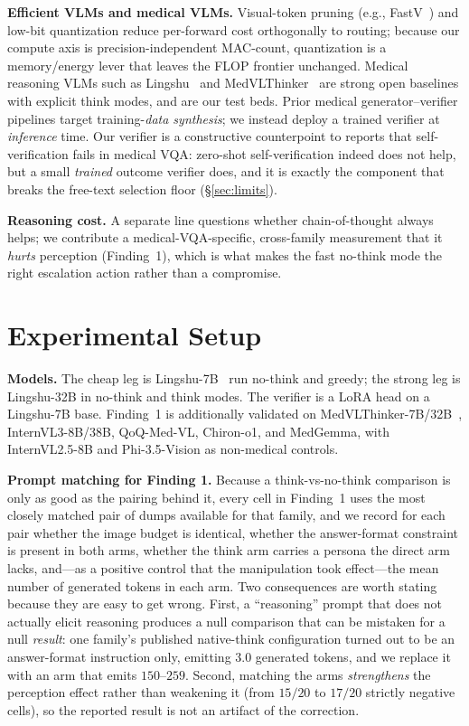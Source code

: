 \documentclass[conference]{IEEEtran}
\begin{document}
\textbf{Efficient VLMs and medical VLMs.} Visual-token pruning (e.g., FastV~\cite{fastv}) and low-bit quantization reduce per-forward cost orthogonally to routing; because our compute axis is precision-independent MAC-count, quantization is a memory/energy lever that leaves the FLOP frontier unchanged. Medical reasoning VLMs such as Lingshu~\cite{lingshu} and MedVLThinker~\cite{medvlthinker} are strong open baselines with explicit think modes, and are our test beds. Prior medical generator--verifier pipelines target training-\emph{data synthesis}; we instead deploy a trained verifier at \emph{inference} time. Our verifier is a constructive counterpoint to reports that self-verification fails in medical VQA: zero-shot self-verification indeed does not help, but a small \emph{trained} outcome verifier does, and it is exactly the component that breaks the free-text selection floor (\S\ref{sec:limits}).

\textbf{Reasoning cost.} A separate line questions whether chain-of-thought always helps; we contribute a medical-VQA-specific, cross-family measurement that it \emph{hurts} perception (Finding~1), which is what makes the fast no-think mode the right escalation action rather than a compromise.

\section{Experimental Setup}\label{sec:setup}
\textbf{Models.} The cheap leg is Lingshu-7B~\cite{lingshu} run no-think and greedy; the strong leg is Lingshu-32B in no-think and think modes. The verifier is a LoRA head on a Lingshu-7B base. Finding~1 is additionally validated on MedVLThinker-7B/32B~\cite{medvlthinker}, InternVL3-8B/38B, QoQ-Med-VL, Chiron-o1, and MedGemma, with InternVL2.5-8B and Phi-3.5-Vision as non-medical controls.

\textbf{Prompt matching for Finding 1.} Because a think-vs-no-think comparison is only as good as the pairing behind it, every cell in Finding~1 uses the most closely matched pair of dumps available for that family, and we record for each pair whether the image budget is identical, whether the answer-format constraint is present in both arms, whether the think arm carries a persona the direct arm lacks, and---as a positive control that the manipulation took effect---the mean number of generated tokens in each arm. Two consequences are worth stating because they are easy to get wrong. First, a ``reasoning'' prompt that does not actually elicit reasoning produces a null comparison that can be mistaken for a null \emph{result}: one family's published native-think configuration turned out to be an answer-format instruction only, emitting $3.0$ generated tokens, and we replace it with an arm that emits $150$--$259$. Second, matching the arms \emph{strengthens} the perception effect rather than weakening it (from $15/20$ to $17/20$ strictly negative cells), so the reported result is not an artifact of the correction.
\end{document}

